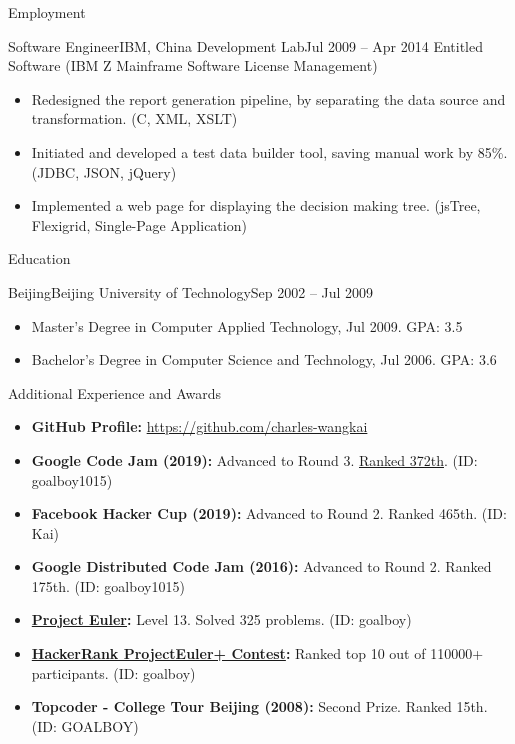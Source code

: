 \documentclass[]{mcdowellcv}
\begin{document}
\begin{cvsection}{Employment}
		\begin{cvsubsection}{Software Engineer}{IBM, China Development Lab}{Jul 2009 – Apr 2014}
			Entitled Software (IBM Z Mainframe Software License Management)
			\begin{itemize}
				\item Redesigned the report generation pipeline, by separating the data source and transformation. (C, XML, XSLT)
				\item Initiated and developed a test data builder tool, saving manual work by 85\%. (JDBC, JSON, jQuery)
				\item Implemented a web page for displaying the decision making tree. (jsTree, Flexigrid, Single-Page Application)
			\end{itemize}
		\end{cvsubsection}
	\end{cvsection}
	
	\begin{cvsection}{Education}
		\begin{cvsubsection}{Beijing}{Beijing University of Technology}{Sep 2002 – Jul 2009}
			\begin{itemize}
				\item Master's Degree in Computer Applied Technology, Jul 2009. GPA: 3.5
				\item Bachelor's Degree in Computer Science and Technology, Jul 2006. GPA: 3.6
			\end{itemize}
		\end{cvsubsection}
	\end{cvsection}
	
	\begin{cvsection}{Additional Experience and Awards}
		\begin{cvsubsection}{}{}{}
			\begin{itemize}
				\item \textbf{GitHub Profile:} \url{https://github.com/charles-wangkai}
				\item \textbf{Google Code Jam (2019):} Advanced to Round 3. {\href{http://charles-wangkai.github.io/certificates/certificate_google_code_jam_2019.pdf}{Ranked 372th}}. (ID: goalboy1015)
				\item \textbf{Facebook Hacker Cup (2019):} Advanced to Round 2. Ranked 465th. (ID: Kai)
				\item \textbf{Google Distributed Code Jam (2016):} Advanced to Round 2. Ranked 175th. (ID: goalboy1015)
				\item \textbf{\href{https://projecteuler.net}{Project Euler}:} Level 13. Solved 325 problems. (ID: goalboy)
				\item \textbf{\href{https://www.hackerrank.com/projecteuler}{HackerRank ProjectEuler+ Contest}:} Ranked top 10 out of 110000+ participants. (ID: goalboy)
				\item \textbf{Topcoder - College Tour Beijing (2008):} Second Prize. Ranked 15th. (ID: GOALBOY)
			\end{itemize}
		\end{cvsubsection}
	\end{cvsection}
	
\end{document}
